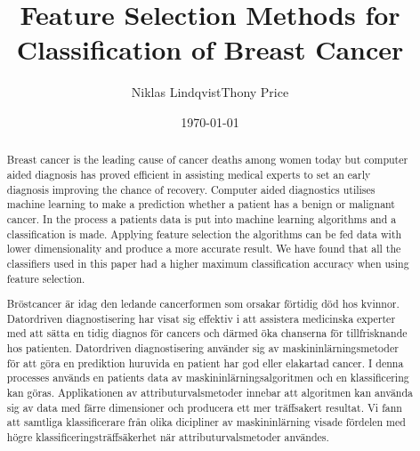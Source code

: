 \documentclass{kththesis}
\title{Feature Selection Methods for Classification of Breast Cancer}
\author{Niklas Lindqvist\newline Thony Price}
\date{\today}
\begin{document}
\frontmatter
\titlepage



\begin{abstract}

  Breast cancer is the leading cause of cancer deaths among women today but computer aided diagnosis has proved efficient in assisting medical experts to set an early diagnosis improving the chance of recovery. Computer aided diagnostics utilises machine learning to make a prediction whether a patient has a benign or malignant cancer. In the process a patients data is put into machine learning algorithms and a classification is made. Applying feature selection the algorithms can be fed data with lower dimensionality and produce a more accurate result. We have found that all the classifiers used in this paper had a higher maximum classification accuracy when using feature selection.
\end{abstract}



\begin{otherlanguage}{swedish}
  \begin{abstract}

  Bröstcancer är idag den ledande cancerformen som orsakar förtidig död hos kvinnor. Datordriven diagnostisering har visat sig effektiv i att assistera medicinska experter med att sätta en tidig diagnos för cancers och därmed öka chanserna för tillfrisknande hos patienten. Datordriven diagnostisering använder sig av maskininlärningsmetoder för att göra en prediktion huruvida en patient har god eller elakartad cancer. I denna processes används en patients data av maskininlärningsalgoritmen och en klassificering kan göras. Applikationen av attributurvalsmetoder innebar att algoritmen kan använda sig av data med färre dimensioner och producera ett mer träffsakert resultat. Vi fann att samtliga klassificerare från olika dicipliner av maskininlärning  visade fördelen med högre klassificeringsträffsäkerhet när attributurvalsmetoder användes.



  \end{abstract}

\end{otherlanguage}


\tableofcontents
\mainmatter


\end{document}
